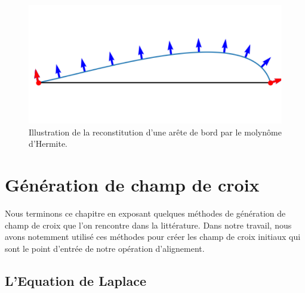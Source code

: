 \begin{figure}[!h]
\centering
\includegraphics[scale=0.8]{images/hermite.pdf}
\caption{Illustration de la reconstitution d'une arête de bord par le molynôme d'Hermite.}
\label{fig:hermite}
\end{figure}



\section{Génération de champ de croix}
\label{subsec:gen_cross_field}

Nous terminons ce chapitre en exposant quelques méthodes de génération de champ de croix que l'on rencontre dans la littérature. Dans notre travail, nous avons notemment utilisé ces méthodes pour créer les champ de croix initiaux qui sont le point d'entrée de notre opération d'alignement.

\subsection{L'Equation de Laplace}

